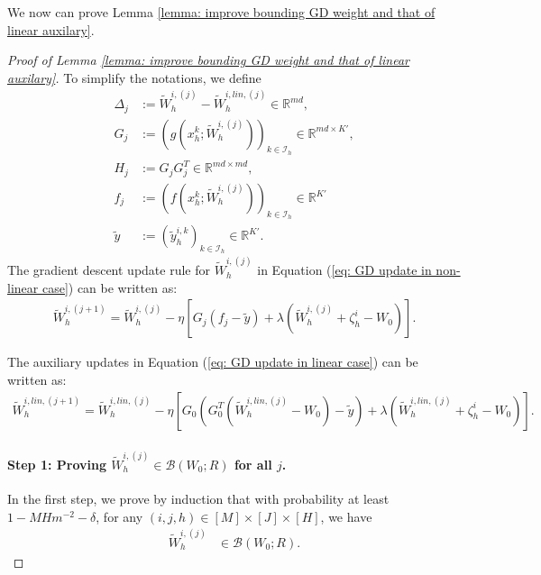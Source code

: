 \documentclass{article} \usepackage{iclr2023/iclr2023_conference,times}
\begin{document}
We now can prove Lemma \ref{lemma: improve bounding GD weight and that of linear auxilary}. 
\begin{proof}[Proof of Lemma \ref{lemma: improve bounding GD weight and that of linear auxilary}]
To simplify the notations, we define 
\begin{align*}
    \Delta_j &:= \tilde{W}_h^{i,(j)} - \tilde{W}_h^{i, lin,(j)} \in \mathbb{R}^{md}, \\
    G_j &:= \left( g(x^k_h; \tilde{W}_h^{i,(j)}) \right)_{k \in \mathcal{I}_h} \in \mathbb{R}^{md \times K' }, \\ 
    H_j &:= G_j G_j^T \in \mathbb{R}^{md \times md}, \\
    f_j &:= \left( f(x^k_h; \tilde{W}_h^{i,(j)})  \right)_{k \in \mathcal{I}_h} \in \mathbb{R}^{K'} \\ 
    \tilde{y} &:= \left( \tilde{y}^{i,k}_h \right)_{k \in \mathcal{I}_h} \in \mathbb{R}^{K'}.
\end{align*}
The gradient descent update rule for $\tilde{W}_h^{i,(j)}$ in Equation (\ref{eq: GD update in non-linear case}) can be written as: 
\begin{align*}
    \tilde{W}_h^{i,(j+1)} = \tilde{W}_h^{i,(j)} - \eta \left[ G_j (f_j - \tilde{y}) + \lambda (\tilde{W}_h^{i,(j)} + \zeta^i_h - W_0 ) \right]. 
\end{align*}

The auxiliary updates in Equation (\ref{eq: GD update in linear case}) can be written as:
\begin{align*}
    \tilde{W}_h^{i,lin,(j+1)} = \tilde{W}_h^{i,lin,(j)} - \eta \left[ G_0 \left( G_0^T ( \tilde{W}_h^{i,lin,(j)} - W_0) - \tilde{y} \right) + \lambda (\tilde{W}_h^{i,lin,(j)} + \zeta^i_h - W_0 ) \right]. 
\end{align*}

\paragraph{Step 1: Proving $\tilde{W}_h^{i, (j)} \in \mathcal{B}(W_0; R)$ for all $j$.} In the first step, we prove by induction that with probability at least $1 -  MH m^{-2} - \delta$, for any $(i,j,h) \in [M] \times [J] \times [H]$, we have 
\begin{align*}
    \tilde{W}_h^{i, (j)} &\in \mathcal{B}(W_0; R). 
\end{align*}


\end{proof}
\end{document}
